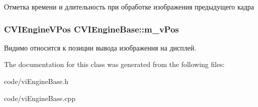 Отметка времени и длительность при обработке изображения предыдущего кадра 

\hypertarget{class_c_v_i_engine_base_afab397345881a9b8a44e6f8eae9805f0}{
\subsubsection[{m\+\_\+v\+Pos}]{\setlength{\rightskip}{0pt plus 5cm}C\+V\+I\+Engine\+V\+Pos C\+V\+I\+Engine\+Base\+::m\+\_\+v\+Pos}}\label{class_c_v_i_engine_base_afab397345881a9b8a44e6f8eae9805f0}


Видимо относится к позиции вывода изображения на дисплей. 



The documentation for this class was generated from the following files\+:\begin{DoxyCompactItemize}
\item 
code/vi\+Engine\+Base.\+h\item 
code/vi\+Engine\+Base.\+cpp\end{DoxyCompactItemize}

